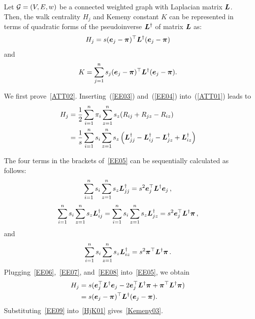\documentclass[10pt,journal,compsoc,twocolumn,twoside]{IEEEtran}
\begin{document}
\begin{lemma}
    \label{HjK} Let \(\mathcal{G}=(V,E,w)\) be a connected weighted graph  with  Laplacian matrix \(\boldsymbol{L}\). Then, the walk centrality \(H_j\) and Kemeny constant \(K\) can be represented  in terms of quadratic forms of the pseudoinverse \(\boldsymbol{L}^{\dagger}\)  of   matrix  \(\boldsymbol{L}\) as:
    \begin{equation}\label{ATT02}
        H_j=s(\boldsymbol{e}_j - \boldsymbol{\pi})^{\top} \boldsymbol{L}^{\dagger} (\boldsymbol{e}_j - \boldsymbol{\pi})
    \end{equation}
    and
    \begin{equation}\label{Kemeny03}
        K= \sum_{j=1}^{n} s_j (\boldsymbol{e}_j - \boldsymbol{\pi})^{\top} \boldsymbol{L}^{\dagger} (\boldsymbol{e}_j - \boldsymbol{\pi}).
    \end{equation}
\end{lemma}
\begin{IEEEproof}
    We first prove~\eqref{ATT02}. Inserting~(\ref{EE03}) and~(\ref{EE04}) into~(\ref{ATT01}) leads to
    \begin{equation}\label{EE05}
        \begin{split}
            H_j&=\frac{1}{2} \sum_{i=1}^{n} \pi_i \sum_{z=1}^{n} s_z(R_{ij}+R_{jz}-R_{iz}) \\
            &=\frac{1}{s} \sum_{i=1}^{n} s_i \sum_{z=1}^{n} s_z \left({\boldsymbol{L}}_{jj}^{\dagger}-{\boldsymbol{L}}_{ij}^{\dagger}-{\boldsymbol{L}}_{jz}^{\dagger}+{\boldsymbol{L}}_{iz}^{\dagger}\right) \\
        \end{split}
    \end{equation}

    The four terms in the brackets of~\eqref{EE05} can be sequentially calculated as follows:
    \begin{equation}\label{EE06}
        \sum_{i=1}^{n} s_i \sum_{z=1}^{n} s_z {\boldsymbol{L}}_{jj}^{\dagger}=s^2 \boldsymbol{e}_j^{\top} \boldsymbol{L}^{\dagger} \boldsymbol{e}_j\,,
    \end{equation}
    \begin{equation}\label{EE07}
        \sum_{i=1}^{n} s_i \sum_{z=1}^{n} s_z {\boldsymbol{L}}_{ij}^{\dagger}=\sum_{i=1}^{n} s_i \sum_{z=1}^{n} s_z {\boldsymbol{L}}_{jz}^{\dagger}=s^2 \boldsymbol{e}_j^{\top} \boldsymbol{L}^{\dagger} \boldsymbol{\pi}\,,
    \end{equation}
    and
    \begin{equation}\label{EE08}
        \sum_{i=1}^{n} s_i  \sum_{z=1}^{n} s_z {\boldsymbol{L}}_{iz}^{\dagger}=s^2 \boldsymbol{\pi}^{\top} \boldsymbol{L}^{\dagger} \boldsymbol{\pi} \,.
    \end{equation}
    Plugging~\eqref{EE06},~\eqref{EE07}, and~\eqref{EE08}  into~\eqref{EE05}, we obtain
    \begin{equation}\label{EE09}
        \begin{split}
            H_j&=s(\boldsymbol{e}_j^{\top} \boldsymbol{L}^{\dagger} \boldsymbol{e}_j - 2 \boldsymbol{e}_j^{\top} \boldsymbol{L}^{\dagger} \boldsymbol{\pi} + \boldsymbol{\pi}^{\top} \boldsymbol{L}^{\dagger} \boldsymbol{\pi}) \\
            &=s(\boldsymbol{e}_j - \boldsymbol{\pi})^{\top} \boldsymbol{L}^{\dagger} (\boldsymbol{e}_j - \boldsymbol{\pi}).
        \end{split}
    \end{equation}
    Substituting~\eqref{EE09}  into~\eqref{HjK01} gives~\eqref{Kemeny03}.
\end{IEEEproof}
\end{document}
